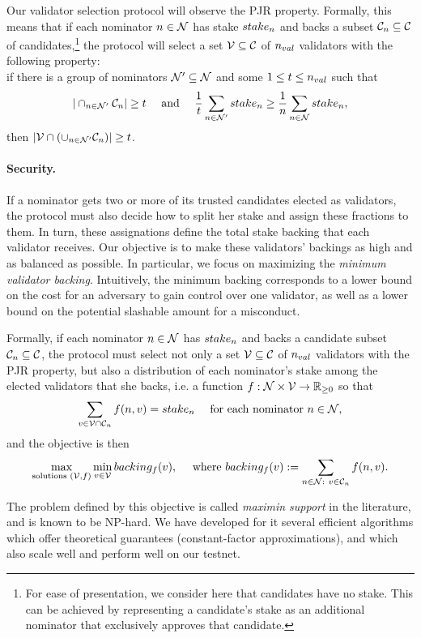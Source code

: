 Our validator selection protocol will observe the PJR property. 
Formally, this means that if each nominator $n \in \mathcal{N}$ has stake $stake_{n}$ and backs a subset 
$\mathcal{C}_{n}\subseteq \mathcal{C}$ of candidates,\footnote{For ease of presentation, we consider here 
that candidates have no stake. This can be achieved by representing a candidate's stake 
as an additional nominator that exclusively approves that candidate.} 
the protocol will select a set $\mathcal{V}\subseteq \mathcal{C}$ of $n_{val}$ validators with the following property: \\
if there is a group of nominators $\mathcal{N}'\subseteq \mathcal{N}$ and some $1\leq t\leq n_{val}$ such that 
$$|\cap_{n\in \mathcal{N}'} \mathcal{C}_n| \geq t \quad \text{ and } \quad  
\frac{1}{t} \sum_{n\in \mathcal{N}'} stake_{n} \geq \frac{1}{n} \sum_{n\in \mathcal{N}} stake_{n},$$
then $|\mathcal{V}\cap (\cup_{n\in\mathcal{N}'} \mathcal{C}_n)| \geq t$.

\paragraph{Security.} If a nominator gets two or more of its trusted candidates elected as validators, 
the protocol must also decide how to split her stake and assign these fractions to them. 
In turn, these assignations define the total stake backing that each validator receives.
Our objective is to make these validators' backings as high and as balanced as possible. 
In particular, we focus on maximizing the \emph{minimum validator backing}. 
Intuitively, the minimum backing corresponds to a lower bound on the cost for an adversary to gain control 
over one validator, as well as a lower bound on the potential slashable amount for a misconduct.

Formally, if each nominator $n \in \mathcal{N}$ has $stake_{n}$ and backs a candidate subset $\mathcal{C}_{n}\subseteq \mathcal{C}$,  
the protocol must select not only a set $\mathcal{V}\subseteq \mathcal{C}$ of $n_{val}$ validators 
with the PJR property, but also a distribution of each nominator's stake among the elected validators that she backs, 
i.e. a function $f:\mathcal{N}\times\mathcal{V} \rightarrow \mathbb{R}_{\geq 0}$ so that 
$$\sum_{v\in \mathcal{V}\cap \mathcal{C}_{n}} f(n, v) = stake_{n} \quad \text{ for each nominator } n\in\mathcal{N},$$
and the objective is then
$$\max_{\text{solutions } (\mathcal{V}, f)} \min_{v\in \mathcal{V}} backing_f(v), 
\quad \text{ where } backing_f(v) := \sum_{n\in \mathcal{N}: \ v\in \mathcal{C}_{n}} f(n, v). $$ 

The problem defined by this objective is called \emph{maximin support} in the literature, and is known to be NP-hard. 
We have developed for it several efficient algorithms which offer theoretical guarantees 
(constant-factor approximations), and which also scale well and perform well on our testnet. 

